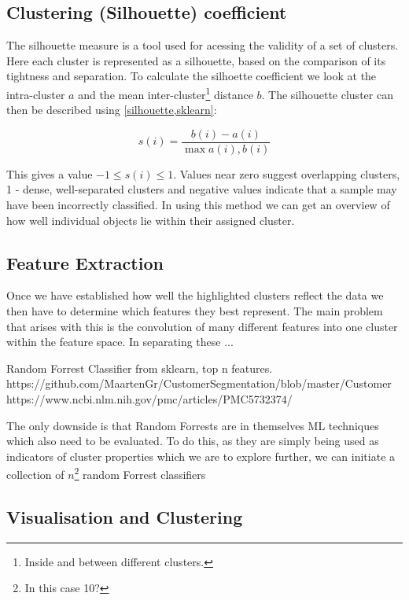 \subsection{Clustering (Silhouette) coefficient}
The silhouette measure is a tool used for acessing the validity of a set of clusters. Here each cluster is represented as a silhouette, based on the comparison of its tightness and separation. To calculate the silhoette coefficient we look at the intra-cluster $a$ and the mean inter-cluster\footnote{Inside and between different clusters.} distance $b$. The silhouette cluster can then be described using \ref{silhouette,sklearn}:

\begin{equation}
s(i) = \frac{b(i)-a(i)}{\max{ a(i), b(i)}}
\end{equation}

This gives a value $-1 \le s(i) \le 1$. Values near zero suggest overlapping clusters, 1 - dense, well-separated clusters and negative values indicate that a sample may have been incorrectly classified. In using this method we can get an overview of how well individual objects lie within their assigned cluster.

\subsection{Feature Extraction}
Once we have established how well the highlighted clusters reflect the data we then have to determine which features they best represent. The main problem that arises with this is the convolution of many different features into one cluster within the feature space. In separating these ...

Random Forrest Classifier from sklearn, top n features.
https://github.com/MaartenGr/CustomerSegmentation/blob/master/Customer%
https://www.ncbi.nlm.nih.gov/pmc/articles/PMC5732374/

The only downside is that Random Forrests are in themselves ML techniques which also need to be evaluated. To do this, as they are simply being used as indicators of cluster properties which we are to explore further, we can initiate a collection of $n$\footnote{In this case 10?} random Forrest classifiers










\subsection{Visualisation and Clustering}

